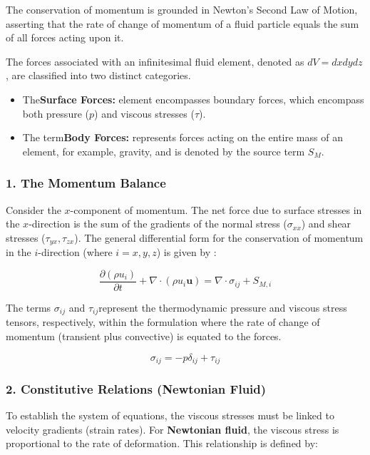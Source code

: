 The conservation of momentum is grounded in Newton's Second Law of Motion, asserting that the rate of change of momentum of a fluid particle equals the sum of all forces acting upon it.
\par
The forces associated with an infinitesimal fluid element, denoted as $dV = dx dy dz$, are classified into two distinct categories.
\begin{itemize}
    \item The\textbf{Surface Forces:} element encompasses boundary forces, which encompass both pressure ($p$) and viscous stresses ($\tau$).

    \item The term\textbf{Body Forces:} represents forces acting on the entire mass of an element, for example, gravity, and is denoted by the source term $S_M$.
\end{itemize}

\subsubsection*{1. The Momentum Balance}
Consider the $x$-component of momentum. The net force due to surface stresses in the $x$-direction is the sum of the gradients of the normal stress ($\sigma_{xx}$) and shear stresses ($\tau_{yx}, \tau_{zx}$). The general differential form for the conservation of momentum in the $i$-direction (where $i=x,y,z$) is given by \cite{versteeg2007cfd}:

\begin{equation}
    \frac{\partial (\rho u_i)}{\partial t} + \nabla \cdot (\rho u_i \mathbf{u}) = \nabla \cdot \sigma_{ij} + S_{M,i}
\end{equation}

The terms $\sigma_{ij}$ and $\tau_{ij}$represent the thermodynamic pressure and viscous stress tensors, respectively, within the formulation where the rate of change of momentum (transient plus convective) is equated to the forces.

\begin{equation}
    \sigma_{ij} = -p \delta_{ij} + \tau_{ij}
\end{equation}

\subsubsection*{2. Constitutive Relations (Newtonian Fluid)}
To establish the system of equations, the viscous stresses must be linked to velocity gradients (strain rates). For \textbf{Newtonian fluid}, the viscous stress is proportional to the rate of deformation. This relationship is defined by:


